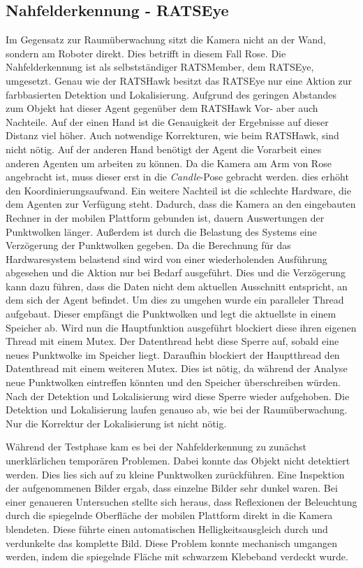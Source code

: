 \subsection{Nahfelderkennung - RATSEye}
Im Gegensatz zur Raumüberwachung sitzt die Kamera nicht an der Wand, sondern am Roboter direkt. Dies betrifft in diesem Fall Rose. Die Nahfelderkennung ist als selbstständiger RATSMember, dem RATSEye, umgesetzt. Genau wie der RATSHawk besitzt das RATSEye nur eine Aktion zur farbbasierten Detektion und Lokalisierung. Aufgrund des geringen Abstandes zum Objekt hat dieser Agent gegenüber dem RATSHawk Vor- aber auch Nachteile. Auf der einen Hand ist die Genauigkeit der Ergebnisse auf dieser Distanz viel höher. Auch notwendige Korrekturen, wie beim RATSHawk, sind nicht nötig. Auf der anderen Hand benötigt der Agent die Vorarbeit eines anderen Agenten um arbeiten zu können. Da die Kamera am Arm von Rose angebracht ist, muss dieser erst in die \textit{Candle}-Pose gebracht werden. dies erhöht den Koordinierungsaufwand. Ein weitere Nachteil ist die schlechte Hardware, die dem Agenten zur Verfügung steht. Dadurch, dass die Kamera an den eingebauten Rechner in der mobilen Plattform gebunden ist, dauern Auswertungen der Punktwolken länger. Außerdem ist durch die Belastung des Systems eine Verzögerung der Punktwolken gegeben. Da die Berechnung für das Hardwaresystem belastend sind wird von einer wiederholenden Ausführung abgesehen und die Aktion nur bei Bedarf ausgeführt. Dies und die Verzögerung kann dazu führen, dass die Daten nicht dem aktuellen Ausschnitt entspricht, an dem sich der Agent befindet. Um dies zu umgehen wurde ein paralleler Thread aufgebaut. Dieser empfängt die Punktwolken und legt die aktuellste in einem Speicher ab. Wird nun die Hauptfunktion ausgeführt blockiert diese ihren eigenen Thread mit einem Mutex. Der Datenthread hebt diese Sperre auf, sobald eine neues Punktwolke im Speicher liegt. Daraufhin blockiert der Hauptthread den Datenthread mit einem weiteren Mutex. Dies ist nötig, da während der Analyse neue Punktwolken eintreffen könnten und den Speicher überschreiben würden. Nach der Detektion und Lokalisierung wird diese Sperre wieder aufgehoben. Die Detektion und Lokalisierung laufen genauso ab, wie bei der Raumüberwachung. Nur die Korrektur der Lokalisierung ist nicht nötig.

Während der Testphase kam es bei der Nahfelderkennung zu zunächst unerklärlichen temporären Problemen. Dabei konnte das Objekt nicht detektiert werden. Dies lies sich auf zu kleine Punktwolken zurückführen. Eine Inspektion der aufgenommenen Bilder ergab, dass einzelne Bilder sehr dunkel waren. Bei einer genaueren Untersuchen stellte sich heraus, dass Reflexionen der Beleuchtung durch die spiegelnde Oberfläche der mobilen Plattform direkt in die Kamera blendeten. Diese führte einen automatischen Helligkeitsausgleich durch und verdunkelte das komplette Bild. Diese Problem konnte mechanisch umgangen werden, indem die spiegelnde Fläche mit schwarzem Klebeband verdeckt wurde.

